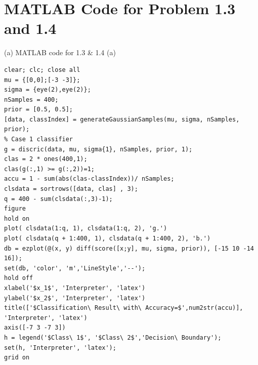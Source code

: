 \documentclass[12pt]{article}
\begin{document}
\vfill
\clearpage

\section{MATLAB Code for Problem 1.3 and 1.4}

(a) MATLAB code for 1.3 \& 1.4 (a)
\begin{lstlisting}
clear; clc; close all
mu = {[0,0];[-3 -3]};
sigma = {eye(2),eye(2)};
nSamples = 400;
prior = [0.5, 0.5];
[data, classIndex] = generateGaussianSamples(mu, sigma, nSamples, prior);
% Case 1 classifier
g = discric(data, mu, sigma{1}, nSamples, prior, 1);
clas = 2 * ones(400,1);
clas(g(:,1) >= g(:,2))=1;
accu = 1 - sum(abs(clas-classIndex))/ nSamples;
clsdata = sortrows([data, clas] , 3);
q = 400 - sum(clsdata(:,3)-1);
figure
hold on
plot( clsdata(1:q, 1), clsdata(1:q, 2), 'g.')
plot( clsdata(q + 1:400, 1), clsdata(q + 1:400, 2), 'b.')
db = ezplot(@(x, y) diff(score([x;y], mu, sigma, prior)), [-15 10 -14 16]);
set(db, 'color', 'm','LineStyle','--');
hold off
xlabel('$x_1$', 'Interpreter', 'latex')
ylabel('$x_2$', 'Interpreter', 'latex')
title(['$Classification\ Result\ with\ Accuracy=$',num2str(accu)], 'Interpreter', 'latex')
axis([-7 3 -7 3])
h = legend('$Class\ 1$', '$Class\ 2$','Decision\ Boundary');
set(h, 'Interpreter', 'latex');
grid on
\end{lstlisting}
\end{document}
